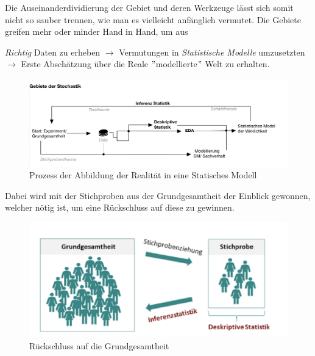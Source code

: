 Die Auseinanderdividierung der Gebiet und deren Werkzeuge lässt sich somit nicht so sauber trennen, wie man es vielleicht anfänglich vermutet. Die Gebiete greifen mehr oder minder Hand in Hand, um aus 
\begin{center}
	\textit{Richtig} Daten zu erheben $\rightarrow$ Vermutungen in \textit{Statistische Modelle} umzusetzten $\rightarrow$ Erste Abschätzung über die Reale $"$modellierte$"$ Welt zu erhalten.
\end{center}



\begin{figure}[H]
	\centering
	\includegraphics[width=0.7\linewidth]{attachment/chapter_13/Scc069}
	\caption{Prozess der Abbildung der Realität in eine Statisches Modell}
\end{figure}

Dabei wird mit der Stichproben aus der Grundgesamtheit der Einblick gewonnen, welcher nötig ist, um eine Rückschluss auf diese zu gewinnen.

\begin{figure}[H]
	\centering
	\includegraphics[width=0.5\linewidth]{attachment/chapter_13/Scc070}
	\caption{Rückschluss auf die Grundgesamtheit} 
\end{figure}

